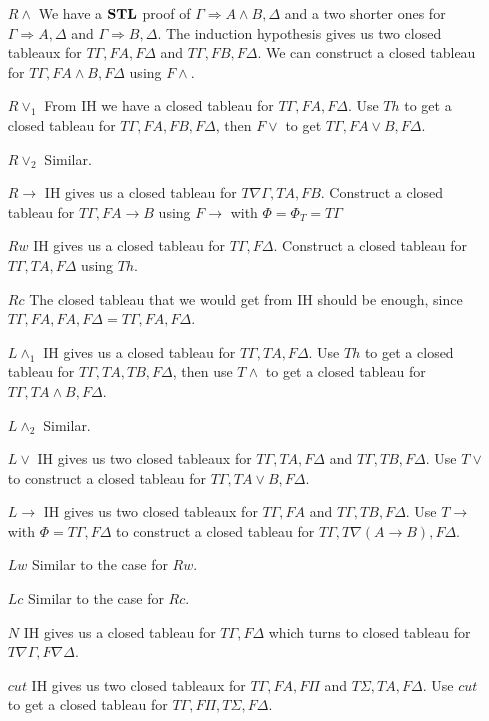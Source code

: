 \documentclass[a4paper, 12pt]{paper}
\begin{document}
\begin{enumerate}
  \item[$R \wedge$] We have a $\mathbf{STL}$ proof of $\Gamma \Rightarrow A \wedge B, \Delta$ and a two shorter ones for $\Gamma \Rightarrow A, \Delta$ and $\Gamma \Rightarrow B, \Delta$. The induction hypothesis gives us two closed tableaux for $T \Gamma, F A, F \Delta$ and $T \Gamma, F B, F \Delta$. We can construct a closed tableau for $T \Gamma, F A \wedge B, F \Delta$ using $F \wedge$.
  \item[$R \vee_1$] From IH we have a closed tableau for $T \Gamma, F A, F \Delta$. Use $Th$ to get a closed tableau for $T \Gamma, F A, F B, F \Delta$, then $F \vee$ to get $T \Gamma, F A \vee B, F \Delta$.
  \item[$R \vee_2$] Similar.
  \item[$R \rightarrow$] IH gives us a closed tableau for $T \nabla \Gamma, T A, F B$. Construct a closed tableau for $T \Gamma, F A \rightarrow B$ using $F \rightarrow$ with $\Phi = \Phi_T = T \Gamma$
  \item[$R w$] IH gives us a closed tableau for $T \Gamma, F \Delta$. Construct a closed tableau for $T \Gamma, T A, F \Delta$ using $Th$.
  \item[$R c$] The closed tableau that we would get from IH should be enough, since $T \Gamma, F A, F A, F \Delta = T \Gamma, F A, F \Delta$.
  \item[$L \wedge_1$] IH gives us a closed tableau for $T \Gamma, T A, F \Delta$. Use $Th$ to get a closed tableau for $T \Gamma, T A, T B, F \Delta$, then use $T \wedge$ to get a closed tableau for $T \Gamma, T A \wedge B, F \Delta$.
  \item[$L \wedge_2$] Similar.
  \item[$L \vee$] IH gives us two closed tableaux for $T \Gamma, T A, F \Delta$ and $T \Gamma, T B, F \Delta$. Use $T \vee$ to construct a closed tableau for $T \Gamma, T A \vee B, F \Delta$.
  \item[$L \rightarrow$] IH gives us two closed tableaux for $T \Gamma, F A$ and $T \Gamma, T B, F \Delta$. Use $T \rightarrow$ with $\Phi = T \Gamma, F \Delta$ to construct a closed tableau for $T \Gamma, T \nabla (A \rightarrow B), F \Delta$.
  \item[$L w$] Similar to the case for $R w$.
  \item[$L c$] Similar to the case for $R c$.
  \item[$N$] IH gives us a closed tableau for $T \Gamma, F \Delta$ which turns to closed tableau for $T \nabla \Gamma, F \nabla \Delta$.
  \item[$cut$] IH gives us two closed tableaux for $T \Gamma, F A, F \Pi$ and $T \Sigma, T A, F \Delta$. Use $cut$ to get a closed tableau for $T \Gamma, F \Pi, T \Sigma, F \Delta$.
\end{enumerate}
\end{document}
